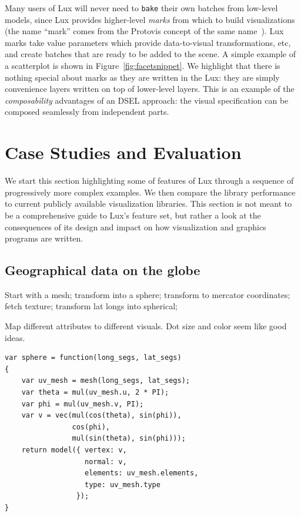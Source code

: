Many users of Lux will never need to \texttt{bake} their own batches
from low-level models, since Lux provides higher-level \emph{marks}
from which to build visualizations (the name ``mark'' comes from the
Protovis concept of the same name~\cite{Bostock:2009:PAG}). Lux
marks take \Shade value parameters which provide data-to-visual
transformations, etc, and create batches that are ready to be added to
the scene. A simple example of a scatterplot is shown in
Figure~\ref{fig:facetsnippet}. We highlight that there is nothing
special about marks as they are written in the Lux: they are simply
convenience layers written on top of lower-level layers. This is an
example of the \emph{composability} advantages of an DSEL approach:
the visual specification can be composed seamlessly from independent
parts.



\section{Case Studies and Evaluation\label{sec:evaluation}}

We start this section highlighting some of features of Lux through a
sequence of progressively more complex examples. We then compare the
library performance to current publicly available visualization
libraries. This section is not meant to be a comprehensive guide to
Lux's feature set, but rather a look at the consequences of its
design and impact on how visualization and graphics programs are written.

\subsection{Geographical data on the globe}

Start with a mesh; transform into a sphere; transform to mercator
coordinates; fetch texture; transform lat longs into spherical;

Map different attributes to different visuals. Dot size and color seem
like good ideas.

\begin{verbatim}
var sphere = function(long_segs, lat_segs)
{
    var uv_mesh = mesh(long_segs, lat_segs);
    var theta = mul(uv_mesh.u, 2 * PI);
    var phi = mul(uv_mesh.v, PI);
    var v = vec(mul(cos(theta), sin(phi)),
                cos(phi),
                mul(sin(theta), sin(phi)));
    return model({ vertex: v,
                   normal: v,
                   elements: uv_mesh.elements,
                   type: uv_mesh.type
                 });
}
\end{verbatim}


